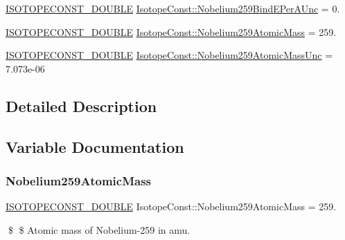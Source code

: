 \begin{DoxyCompactItemize}
\mbox{\hyperlink{group___isotope_const-_macros_ga8f45a7272ce02c0b4c65c44636ed719a}{I\+S\+O\+T\+O\+P\+E\+C\+O\+N\+S\+T\+\_\+\+D\+O\+U\+B\+LE}} \mbox{\hyperlink{group___isotope_const-_nobelium-_no259_ga034d8f5d1708f1376ce319b53424e06e}{Isotope\+Const\+::\+Nobelium259\+Bind\+E\+Per\+A\+Unc}} = 0.
\item 
\mbox{\hyperlink{group___isotope_const-_macros_ga8f45a7272ce02c0b4c65c44636ed719a}{I\+S\+O\+T\+O\+P\+E\+C\+O\+N\+S\+T\+\_\+\+D\+O\+U\+B\+LE}} \mbox{\hyperlink{group___isotope_const-_nobelium-_no259_gaa3cf5c3107c907223985a6d2e5c611fa}{Isotope\+Const\+::\+Nobelium259\+Atomic\+Mass}} = 259.
\item 
\mbox{\hyperlink{group___isotope_const-_macros_ga8f45a7272ce02c0b4c65c44636ed719a}{I\+S\+O\+T\+O\+P\+E\+C\+O\+N\+S\+T\+\_\+\+D\+O\+U\+B\+LE}} \mbox{\hyperlink{group___isotope_const-_nobelium-_no259_gad8655f68837d2fd53ff5736d3819b6a4}{Isotope\+Const\+::\+Nobelium259\+Atomic\+Mass\+Unc}} = 7.\+073e-\/06
\end{DoxyCompactItemize}


\subsection{Detailed Description}


\subsection{Variable Documentation}
\mbox{\label{group___isotope_const-_nobelium-_no259_gaa3cf5c3107c907223985a6d2e5c611fa}} 
\subsubsection{\texorpdfstring{Nobelium259\+Atomic\+Mass}{Nobelium259AtomicMass}}
{\footnotesize\ttfamily \mbox{\hyperlink{group___isotope_const-_macros_ga8f45a7272ce02c0b4c65c44636ed719a}{I\+S\+O\+T\+O\+P\+E\+C\+O\+N\+S\+T\+\_\+\+D\+O\+U\+B\+LE}} Isotope\+Const\+::\+Nobelium259\+Atomic\+Mass = 259.}

\$ \$ Atomic mass of Nobelium-\/259 in amu. \mbox{\label{group___isotope_const-_nobelium-_no259_gad8655f68837d2fd53ff5736d3819b6a4}} 
